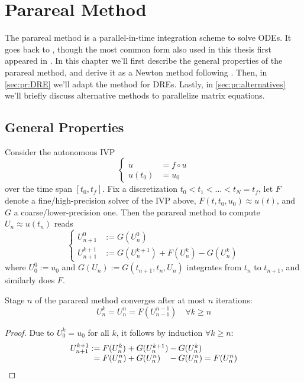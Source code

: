 \chapter{Parareal Method}
\label{sec:pr}

The parareal method is a parallel-in-time integration scheme to solve \acp{ODE}.
It goes back to \cite{Lions2001},
though the most common form also used in this thesis first appeared in \cite{Baffico2002}.
In this chapter we'll first describe the general properties of the parareal method,
and derive it as a Newton method following \cite{Gander2007}.
Then, in \autoref{sec:pr:DRE} we'll adapt the method for \acp{DRE}.
Lastly, in \autoref{sec:pr:alternatives} we'll briefly discuss alternative methods to parallelize matrix equations.

\section{General Properties}
\label{sec:pr:properties}

Consider the autonomous \ac{IVP}
\begin{equation}
  \label{eq:IVP}
  \left\{
  \begin{aligned}
    \dot u &= f \circ u \\
    u(t_0) &= u_0
  \end{aligned}
  \right.
\end{equation}
over the time span $[t_0, t_f]$.
Fix a discretization $t_0 < t_1 < \ldots < t_N = t_f$,
let $F$ denote a fine/high-precision solver of the \ac{IVP} above,
$F(t, t_0, u_0) \approx u(t)$,
and $G$ a coarse/lower-precision one.
Then the parareal method to compute $U_n \approx u(t_n)$ reads
\begin{equation}
  \label{eq:pr:method}
  \left\{
  \begin{aligned}
    U^0_{n+1} &:= G(U^0_n) \\
    U^{k+1}_{n+1} &:= G(U^{k+1}_n) + F(U^k_n) - G(U^k_n)
  \end{aligned}
  \right.
\end{equation}
where $U^0_0 := u_0$ and $G(U_n) := G(t_{n+1}, t_n, U_n)$
integrates from $t_n$ to $t_{n+1}$,
and similarly does $F$.

\begin{proposition}
\label{thm:pr:conv}
  Stage $n$ of the parareal method converges after at most $n$ iterations:
  \begin{equation*}
    U^k_n = U^n_n = F(U^{n-1}_{n-1})
    \quad
    \forall k \geq n
  \end{equation*}
\end{proposition}
\begin{proof}
  Due to $U^k_0 = u_0$ for all $k$,
  it follows by induction $\forall k \geq n$:
  \begin{equation*}
    \begin{array}{r@{}l@{}l@{}l}
      U^{k+1}_{n+1}
      :={} & F(U^k_n) &{}+ G(U^{k+1}_n) &{}- G(U^k_n) \\
      ={}  & F(U^n_n) &{}+ G(U^n_n)     &{}- G(U^n_n)
      = F(U^n_n)
    \end{array}
  \end{equation*}
\end{proof}

